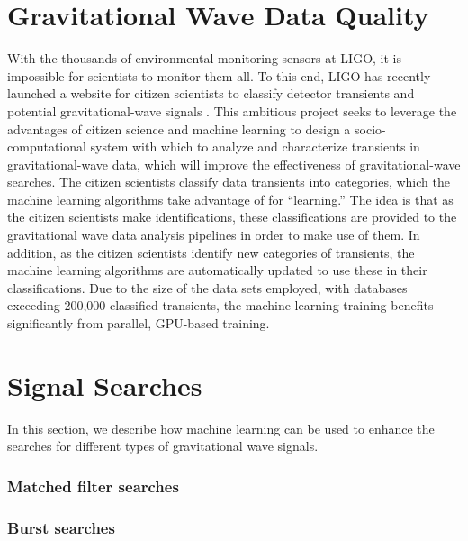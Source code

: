 \documentclass[letterpaper, aps, prd, superscriptaddress, showpacs, nofootinbib]{revtex4}
\begin{document}
\section{Gravitational Wave Data Quality}
\label{sec:gw_data}

With the thousands of environmental monitoring sensors at LIGO, it is impossible for scientists to monitor them all. To this end, LIGO has recently launched a website for citizen scientists to classify detector transients and potential gravitational-wave signals \cite{gravityspy}. This ambitious project seeks to leverage the advantages of citizen science and machine learning to design a socio-computational system with which to analyze and characterize transients in gravitational-wave data, which will improve the effectiveness of gravitational-wave searches. The citizen scientists classify data transients into categories, which the machine learning algorithms take advantage of for ``learning.'' The idea is that as the citizen scientists make identifications, these classifications are provided to the gravitational wave data analysis pipelines in order to make use of them. In addition, as the citizen scientists identify new categories of transients, the machine learning algorithms are automatically updated to use these in their classifications. Due to the size of the data sets employed, with databases exceeding 200,000 classified transients, the machine learning training benefits significantly from parallel, GPU-based training.

\section{Signal Searches}
\label{sec:searches}

In this section, we describe how machine learning can be used to enhance the searches for 
different types of gravitational wave signals. 

\subsubsection{Matched filter searches}

\subsubsection{Burst searches}
\end{document}
